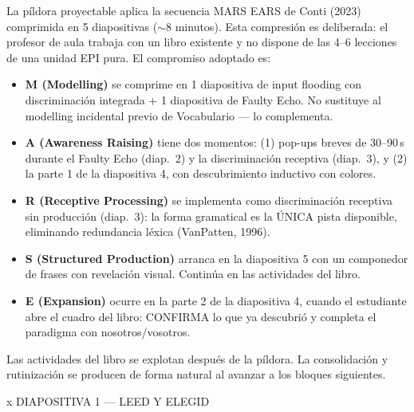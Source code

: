 \documentclass[a4paper,10pt]{article}
\begin{document}
\begin{tcolorbox}[colback=gris, colframe=grismedio, fonttitle=\bfseries\small, title={Nota sobre el formato de la píldora proyectable}, boxrule=0.5pt, arc=2pt, left=6pt, right=6pt, top=4pt, bottom=4pt]
{\small
La píldora proyectable aplica la secuencia MARS EARS de Conti (2023) comprimida en 5 diapositivas ($\sim$8 minutos). Esta compresión es deliberada: el profesor de aula trabaja con un libro existente y no dispone de las 4--6 lecciones de una unidad EPI pura. El compromiso adoptado es:

\begin{itemize}[leftmargin=1.2em, itemsep=1pt, topsep=2pt]
\item \textbf{M (Modelling)} se comprime en 1 diapositiva de input flooding con discriminación integrada + 1 diapositiva de Faulty Echo. No sustituye al modelling incidental previo de Vocabulario — lo complementa.
\item \textbf{A (Awareness Raising)} tiene dos momentos: (1) pop-ups breves de 30--90\,s durante el Faulty Echo (diap.~2) y la discriminación receptiva (diap.~3), y (2) la parte 1 de la diapositiva 4, con descubrimiento inductivo con colores.
\item \textbf{R (Receptive Processing)} se implementa como discriminación receptiva sin producción (diap.~3): la forma gramatical es la ÚNICA pista disponible, eliminando redundancia léxica (VanPatten, 1996).
\item \textbf{S (Structured Production)} arranca en la diapositiva 5 con un componedor de frases con revelación visual. Continúa en las actividades del libro.
\item \textbf{E (Expansion)} ocurre en la parte 2 de la diapositiva 4, cuando el estudiante abre el cuadro del libro: CONFIRMA lo que ya descubrió y completa el paradigma con nosotros/vosotros.
\end{itemize}

Las actividades del libro se explotan después de la píldora. La consolidación y rutinización se producen de forma natural al avanzar a los bloques siguientes.
}
\end{tcolorbox}

\newpage


\begin{diapheader}{x}
DIAPOSITIVA 1 — LEED Y ELEGID
\end{diapheader}
\end{document}

